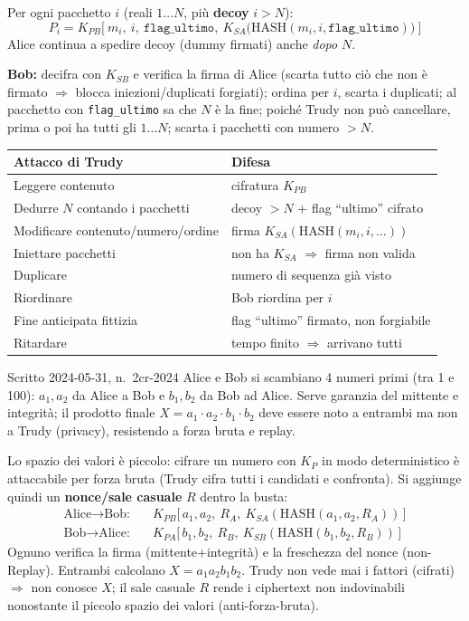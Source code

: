 \documentclass{report}
\newcommand{\Ks}[1]{K_{S#1}}   %
\newcommand{\Kp}[1]{K_{P#1}}   %
\newcommand{\HASH}{\text{HASH}}
\begin{document}
\begin{solution}
Per ogni pacchetto $i$ (reali $1\dots N$, più \textbf{decoy} $i>N$):
\[
P_i=\Kp{B}\big[\ m_i,\ i,\ \texttt{flag\_ultimo},\ \Ks{A}\big(\HASH(m_i,i,\texttt{flag\_ultimo})\big)\ \big]
\]
Alice continua a spedire decoy (dummy firmati) anche \emph{dopo} $N$.

\medskip
\textbf{Bob:} decifra con $\Ks{B}$ e verifica la firma di Alice (scarta tutto ciò
che non è firmato $\Rightarrow$ blocca iniezioni/duplicati forgiati); ordina per
$i$, scarta i duplicati; al pacchetto con \texttt{flag\_ultimo} sa che $N$ è la
fine; poiché Trudy non può cancellare, prima o poi ha tutti gli $1\dots N$;
scarta i pacchetti con numero $>N$.

\medskip
\begin{tabularx}{\linewidth}{lX}
\hline
Attacco di Trudy & Difesa \\
\hline
Leggere contenuto & cifratura $\Kp{B}$ \\
Dedurre $N$ contando i pacchetti & decoy $>N$ + flag ``ultimo'' cifrato \\
Modificare contenuto/numero/ordine & firma $\Ks{A}(\HASH(m_i,i,\dots))$ \\
Iniettare pacchetti & non ha $\Ks{A}$ $\Rightarrow$ firma non valida \\
Duplicare & numero di sequenza già visto \\
Riordinare & Bob riordina per $i$ \\
Fine anticipata fittizia & flag ``ultimo'' firmato, non forgiabile \\
Ritardare & tempo finito $\Rightarrow$ arrivano tutti \\
\hline
\end{tabularx}
\end{solution}

\begin{Exercise}{Scritto 2024-05-31, n.\ 2}{cr-2024}
Alice e Bob si scambiano 4 numeri primi (tra 1 e 100): $a_1,a_2$ da Alice a Bob
e $b_1,b_2$ da Bob ad Alice. Serve garanzia del mittente e integrità; il
prodotto finale $X=a_1\cdot a_2\cdot b_1\cdot b_2$ deve essere noto a entrambi ma
non a Trudy (privacy), resistendo a forza bruta e replay.
\end{Exercise}

\begin{solution}
Lo spazio dei valori è piccolo: cifrare un numero con $\Kp{}$ in modo
deterministico è attaccabile per forza bruta (Trudy cifra tutti i candidati e
confronta). Si aggiunge quindi un \textbf{nonce/sale casuale} $R$ dentro la busta:
\begin{align*}
\text{Alice}\to\text{Bob:}\quad & \Kp{B}\big[\,a_1,a_2,\ R_A,\ \Ks{A}(\HASH(a_1,a_2,R_A))\,\big]\\
\text{Bob}\to\text{Alice:}\quad & \Kp{A}\big[\,b_1,b_2,\ R_B,\ \Ks{B}(\HASH(b_1,b_2,R_B))\,\big]
\end{align*}
Ognuno verifica la firma (mittente+integrità) e la freschezza del nonce
(non-Replay). Entrambi calcolano $X=a_1 a_2 b_1 b_2$. Trudy non vede mai i
fattori (cifrati) $\Rightarrow$ non conosce $X$; il sale casuale $R$ rende i
ciphertext non indovinabili nonostante il piccolo spazio dei valori
(anti-forza-bruta).
\end{solution}
\end{document}
